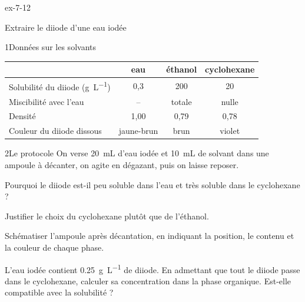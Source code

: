 \begin{blocLivre}{ex-7-12}
\begin{exercice}[3]{Extraire le diiode d'une eau iodée}
\begin{docu}{1}{Données sur les solvants}
\par\smallskip\noindent\hfill\begin{tabular}{lccc}
\toprule
 & eau & éthanol & cyclohexane \\
\midrule
Solubilité du diiode (\unit{g.L^{-1}}) & 0,3 & 200 & 20 \\
Miscibilité avec l'eau & -- & totale & nulle \\
Densité & 1,00 & 0,79 & 0,78 \\
Couleur du diiode dissous & jaune-brun & brun & violet \\
\bottomrule
\end{tabular}\hfill\null\par\smallskip
\end{docu}
\begin{docu}{2}{Le protocole}
On verse \qty{20}{mL} d'eau iodée et \qty{10}{mL} de solvant dans une ampoule à décanter, on agite en dégazant, puis on laisse
reposer.
\end{docu}
\begin{questions}
\item Pourquoi le diiode est-il peu soluble dans l'eau et très soluble dans le cyclohexane ?
\item Justifier le choix du cyclohexane plutôt que de l'éthanol.
\item Schématiser l'ampoule après décantation, en indiquant la position, le contenu et la couleur de chaque phase.
\item \initiative L'eau iodée contient \qty{0,25}{g.L^{-1}} de diiode. En admettant que tout le diiode passe dans le cyclohexane, calculer sa
concentration dans la phase organique. Est-elle compatible avec la solubilité ?
\end{questions}
\end{exercice}
\end{blocLivre}
